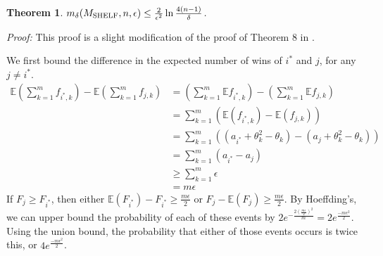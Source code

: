 \documentclass[letterpaper,12pt]{article}
\newcommand{\E}{\mathbb{E}}
\newcommand{\1}{\mathbbm{1}}
\newtheorem{theorem}{Theorem}
\begin{document}


\begin{theorem}
  \label{shelf_bound}
    $m_\delta(M_{\mathrm{SHELF}}, n, \epsilon) \leq \frac{2}{\epsilon^2} \ln \frac{4(n-1)}{\delta}$.
\end{theorem}
\emph{Proof:} This proof is a slight modification of the proof of Theorem 8 in \cite{elf}.

We first bound the difference in the expected number of wins of $i^*$ and $j$, for any $j \neq i^*$. 
\begin{align*}
  \E \left( \sum_{k=1}^m f_{i^*, k}\right) - \E \left( \sum_{k=1}^m f_{j, k}\right)
  &= \left( \sum_{k=1}^m \E f_{i^*, k}\right) - \left( \sum_{k=1}^m \E f_{j, k}\right)\\
  &= \sum_{k=1}^m \left(\E (f_{i^*, k}) - \E (f_{j, k})\right)\\
  &= \sum_{k=1}^m \left((a_{i^*} + \theta_k^2 - \theta_k) - (a_j + \theta_k^2 - \theta_k)\right)\\
  &= \sum_{k=1}^m \left(a_{i^*} - a_j\right)\\
  &\geq \sum_{k=1}^m \epsilon\\
  &=m \epsilon
\end{align*}
If $F_j \geq F_{i^*}$, then either $\E(F_{i^*}) - F_{i^*} \geq \frac{m \epsilon}{2}$ or $F_j - \E(F_j) \geq \frac{m \epsilon}{2}$. By Hoeffding's, we can upper bound the probability of each of these events by $2 e^{-\frac{2 (\frac{m \epsilon}{2})^2}{m}} = 2 e^{\frac{- m \epsilon^2}{2}}$. Using the union bound, the probability that either of those events occurs is twice this, or $4 e^{\frac{- m \epsilon^2}{2}}$.
\end{document}
